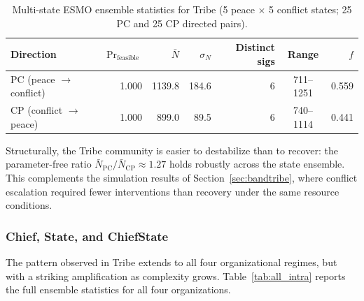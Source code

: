\begin{table}[ht]
  \centering
  \caption{Multi-state ESMO ensemble statistics for Tribe (5 peace
    $\times$ 5 conflict states; 25 PC and 25 CP directed pairs).}
  \label{tab:tribe_intra}
  \begin{tabular}{lrrrrcr}
    \hline
    Direction & $\Pr_{\text{feasible}}$ & $\bar{N}$ & $\sigma_N$ &
    Distinct sigs & Range & $f$ \\
    \hline
    PC (peace $\to$ conflict) & 1.000 & 1139.8 & 184.6 & 6 & 711--1251 & 0.559 \\
    CP (conflict $\to$ peace) & 1.000 &  899.0 &  89.5 & 6 & 740--1114 & 0.441 \\
    \hline
  \end{tabular}
\end{table}

Structurally, the Tribe community is easier to destabilize than to
recover: the parameter-free ratio $\bar{N}_{\text{PC}} /
\bar{N}_{\text{CP}} \approx 1.27$ holds robustly across the state
ensemble.  This complements the simulation results of
Section~\ref{sec:bandtribe}, where conflict escalation required fewer
interventions than recovery under the same resource conditions.

\subsubsection*{Chief, State, and ChiefState}

The pattern observed in Tribe extends to all four organizational regimes,
but with a striking amplification as complexity grows.
Table~\ref{tab:all_intra} reports the full ensemble statistics for all four
organizations.

